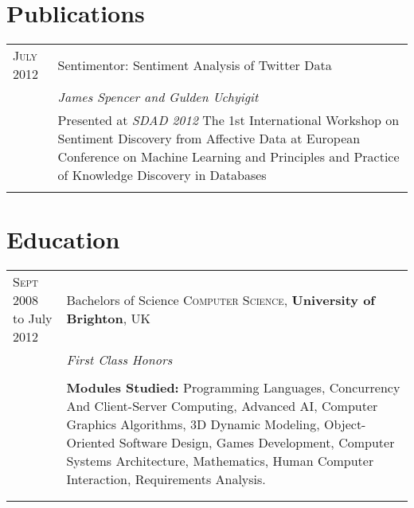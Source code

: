\documentclass[a4paper,10pt]{article} %
\begin{document}

\section{Publications}

\begin{tabular}{ L{2cm} | L{11cm}}	
\textsc{July} 2012 & Sentimentor: Sentiment Analysis of Twitter Data\\
& \small\emph{James Spencer and Gulden Uchyigit} \\
& \small Presented at \emph{SDAD 2012  } The 1st International Workshop on Sentiment Discovery from Affective Data at European Conference on Machine Learning and Principles and Practice of Knowledge Discovery in Databases\\



&\\
\end{tabular}



\section{Education}

\begin{tabular}{ L{2cm} | L{11cm}}	
\textsc{Sept} 2008 to July 2012  & Bachelors of Science \textsc{Computer Science}, \textbf{University of Brighton}, UK\\
& \small\emph{First Class Honors} \\
&\normalsize \\
& \small\textbf{Modules Studied:} Programming Languages, Concurrency And Client-Server Computing, Advanced AI, Computer Graphics Algorithms, 3D Dynamic Modeling, Object-Oriented Software Design, Games Development, Computer Systems Architecture, Mathematics, Human Computer Interaction, Requirements Analysis. \\
&\\

 \\
\end{tabular}

\newpage
\end{document}
